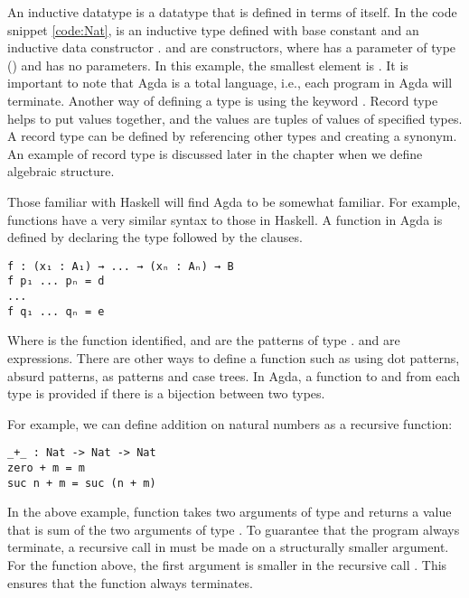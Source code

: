 An inductive datatype is a datatype that is defined in terms of itself. In the
code snippet \ref{code:Nat},  is an inductive type defined with base
constant  and an inductive data constructor .
 and  are constructors, where  has a
parameter of type () and  has no parameters. In this
example, the smallest element is . It is important to note that
Agda is a total language, i.e., each program in Agda will
terminate\cite{kidney2020finiteness}. Another way of defining a type is using
the keyword . Record type helps to put values together, and the
values are tuples of values of specified types. A record type can be defined by
referencing other types and creating a synonym. An example of record type is
discussed later in the chapter when we define algebraic structure.

Those familiar with Haskell will find Agda to be somewhat familiar. For example,
functions have a very similar syntax to those in Haskell. A function in Agda is
defined by declaring the type followed by the clauses.

\begin{verbatim}
f : (x₁ : A₁) → ... → (xₙ : Aₙ) → B
f p₁ ... pₙ = d
...
f q₁ ... qₙ = e
\end{verbatim} 
Where  is the function identified,  and  are the
patterns of type .  and  are expressions. There
are other ways to define a function such as using dot patterns, absurd patterns,
as patterns and case trees. In Agda, a function to and from each type is
provided if there is a bijection between two types.

For example, we can define addition on natural numbers as a recursive function:

\label{code:Add}
\begin{verbatim}
_+_ : Nat -> Nat -> Nat
zero + m = m
suc n + m = suc (n + m)
\end{verbatim}

In the above example, function \inline{_+_} takes two arguments of type
 and returns a value that is sum of the two arguments of type
. To guarantee that the program always terminate, a recursive call
in must be made on a structurally smaller argument. For the function
\inline{_+_} above, the first argument  is smaller in the recursive
call . This ensures that the function \inline{_+_} always
terminates.

